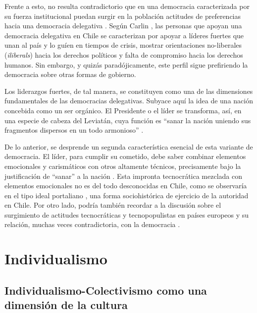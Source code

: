\documentclass[12pt,twoside]{templates/facsothesis}
\begin{document}
Frente a esto, no resulta contradictorio que en una democracia caracterizada por su fuerza institucional puedan surgir en la población actitudes de preferencias hacia una democracia delegativa \citep{carlin2011, carlin2018}. Según Carlin \citeyearpar{carlin2018}, las personas que apoyan una democracia delegativa en Chile se caracterizan por apoyar a líderes fuertes que unan al país y lo guíen en tiempos de crisis, mostrar orientaciones no-liberales (\emph{iliberals}) hacia los derechos políticos y falta de compromiso hacia los derechos humanos. Sin embargo, y quizás paradójicamente, este perfil sigue prefiriendo la democracia sobre otras formas de gobierno.

Los liderazgos fuertes, de tal manera, se constituyen como una de las dimensiones fundamentales de las democracias delegativas. Subyace aquí la idea de una nación concebida como un ser orgánico. El Presidente o el líder se transforma, así, en una especie de cabeza del Leviatán, cuya función es ``sanar la nación uniendo sus fragmentos dispersos en un todo armonioso'' \citep[p.60]{odonnell1994}.

De lo anterior, se desprende un segunda característica esencial de esta variante de democracia. El líder, para cumplir su cometido, debe saber combinar elementos emocionales y carismáticos con otros altamente técnicos, precisamente bajo la justificación de ``sanar'' a la nación \citep{odonnell1994}. Esta impronta tecnocrática mezclada con elementos emocionales no es del todo desconocidas en Chile, como se observaría en el tipo ideal portaliano \citep{araujo2013}, una forma sociohistórica de ejercicio de la autoridad en Chile. Por otro lado, podría también recordar a la discusión sobre el surgimiento de actitudes tecnocráticas y tecnopopulistas en países europeos y su relación, muchas veces contradictoria, con la democracia \citep{chiru2022, ganuza2020, pilet2023}.

\hypertarget{individualismo}{%
\section{Individualismo}\label{individualismo}}

\hypertarget{individualismo-colectivismo-como-una-dimensiuxf3n-de-la-cultura}{%
\subsection{Individualismo-Colectivismo como una dimensión de la cultura}\label{individualismo-colectivismo-como-una-dimensiuxf3n-de-la-cultura}}
\end{document}
